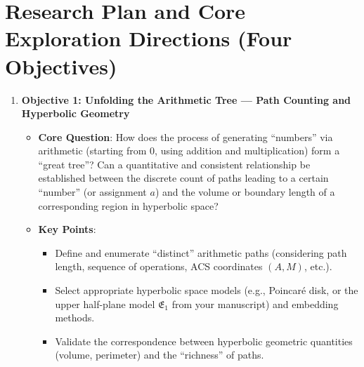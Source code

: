 \documentclass[12pt]{article}
\begin{document}
\section{Research Plan and Core Exploration Directions (Four Objectives)}

\begin{enumerate}
    \item \textbf{Objective 1: Unfolding the Arithmetic Tree --- Path Counting and Hyperbolic Geometry}
    \begin{itemize}
        \item \textbf{Core Question}: How does the process of generating ``numbers'' via arithmetic (starting from 0, using addition and multiplication) form a ``great tree''? Can a quantitative and consistent relationship be established between the discrete count of paths leading to a certain ``number'' (or assignment $a$) and the volume or boundary length of a corresponding region in hyperbolic space?
        \item \textbf{Key Points}:
        \begin{itemize}
            \item Define and enumerate ``distinct'' arithmetic paths (considering path length, sequence of operations, ACS coordinates $(A,M)$, etc.).
            \item Select appropriate hyperbolic space models (e.g., Poincaré disk, or the upper half-plane model $\mathfrak{E}_1$ from your manuscript) and embedding methods.
            \item Validate the correspondence between hyperbolic geometric quantities (volume, perimeter) and the ``richness'' of paths.
        \end{itemize}
    \end{itemize}


\end{enumerate}
\end{document}
